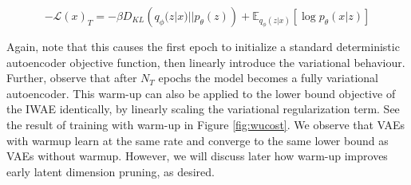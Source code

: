 \documentclass{article} %
\renewcommand{\L}{\mathcal{L}}
\begin{document}
\begin{equation}
    -\L(x)_T=-\beta D_{KL}\left(q_\phi(z|x)||p_\theta(z)\right)+\mathbb{E}_{q_\phi(z|x)}\left[\log{p_\theta(x|z)}\right]
\end{equation}

Again, note that this causes the first epoch to initialize a standard deterministic autoencoder objective function, then linearly introduce the variational behaviour. Further, observe that after $N_T$ epochs the model becomes a fully variational autoencoder. This warm-up can also be applied to the lower bound objective of the IWAE identically, by linearly scaling the variational regularization term. See the result of training with warm-up in Figure \ref{fig:wucost}. We observe that VAEs with warmup learn at the same rate and converge to the same lower bound as VAEs without warmup. However, we will discuss later how warm-up improves early latent dimension pruning, as desired. 
\end{document}
